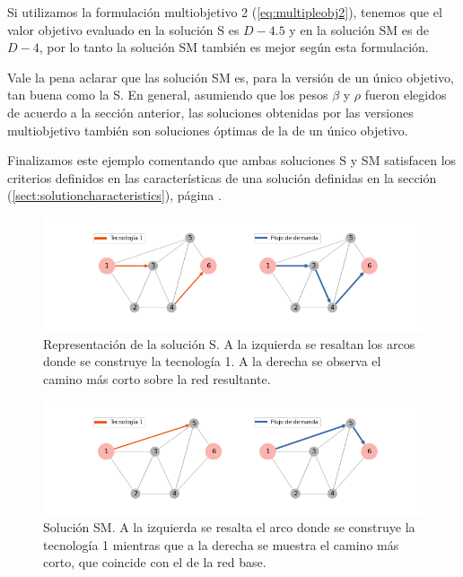 Si utilizamos la formulación multiobjetivo 2 (\ref{eq:multipleobj2}), tenemos que el valor objetivo evaluado en la solución S es $D - 4.5$ y en la solución SM es de $D - 4$, por lo tanto la solución SM también es mejor según esta formulación.

Vale la pena aclarar que las solución SM es, para la versión de un único objetivo, tan buena como la S. En general, asumiendo que los pesos $\beta$ y $\rho$ fueron elegidos de acuerdo a la sección anterior, las soluciones obtenidas por las versiones multiobjetivo también son soluciones óptimas de la de un único objetivo.

Finalizamos este ejemplo comentando que ambas soluciones S y SM satisfacen los criterios definidos en las características de una solución definidas en la sección (\ref{sect:solutioncharacteristics}), página \pageref{sect:solutioncharacteristics}.

\begin{figure}[h!]
  \centering
  \includegraphics[width=12cm]{../resources/example_2_sol_v2.png}
  \caption{Representación de la solución S. A la izquierda se resaltan los arcos donde se construye la tecnología 1. A la derecha se observa el camino más corto sobre la red resultante.}
  \label{fig:example2solv2}
\end{figure}

\begin{figure}[h!]
  \centering
  \includegraphics[width=12cm]{../resources/example_2_sol_v1.png}
  \caption{Solución SM. A la izquierda se resalta el arco donde se construye la tecnología 1 mientras que a la derecha se muestra el camino más corto, que coincide con el de la red base.}
  \label{fig:example2solv1}
\end{figure}

